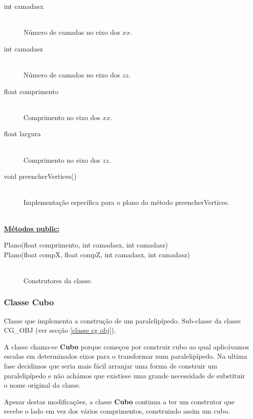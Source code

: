 \documentclass[a5paper,onecolumn, 11pt]{article}
\begin{document}
\begin{description}
	\item[int camadasx] \hfill \\
	Número de camadas no eixo dos $xx$.

	\item[int camadasz] \hfill \\
	Número de camadas no eixo dos $zz$.

	\item[float comprimento] \hfill \\
	Comprimento no eixo dos $xx$.

	\item[float largura] \hfill \\
	Comprimento no eixo dos $zz$.

	\item[void preencherVertices()] \hfill \\
	Implementação específica para o plano do método preencherVertices.
\end{description}

\hfill \\ \underline{\textbf{Métodos public:}}

\begin{description}
	\item[Plano(float comprimento, int camadasx, int camadasz)]
	\item[Plano(float compX, float compZ, int camadasx, int camadasz)] \hfill \\
	Construtores da classe.
\end{description}

\clearpage
\subsubsection{Classe Cubo} \label{classe cubo}
Classe que implementa a construção de um paralelipípedo. Sub-classe da classe CG\_OBJ (ver secção \ref{classe cg obj}).

A classe chama-se \textbf{Cubo} porque começou por construir cubo ao qual aplicávamos escalas em determinados eixos para o transformar num paralelipípedo. Na ultima fase decidimos que seria mais fácil arranjar uma forma de construir um paralelipípedo e não achámos que existisse uma grande necessidade de substituir o nome original da classe.

Apesar destas modificações, a classe \textbf{Cubo} continua a ter um construtor que recebe o lado em vez dos vários comprimentos, construindo assim um cubo.
\end{document}
